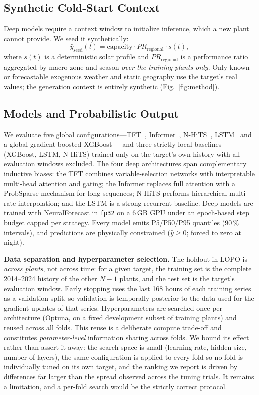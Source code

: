 \documentclass[conference]{IEEEtran}
\begin{document}
\subsection{Synthetic Cold-Start Context}
Deep models require a context window to initialize inference, which a new plant cannot
provide. We seed it synthetically:
\begin{equation}
\hat{y}_{\text{seed}}(t) = \mathrm{capacity}\cdot PR_{\text{regional}}\cdot s(t),
\end{equation}
where $s(t)$ is a deterministic solar profile and $PR_{\text{regional}}$ is a performance
ratio aggregated by macro-zone and season \emph{over the training plants only}. Only known or
forecastable exogenous weather and static geography use the target's real values; the
generation context is entirely synthetic (Fig.~\ref{fig:method}).

\subsection{Models and Probabilistic Output}
We evaluate five global configurations---TFT~\cite{Lim2021}, Informer~\cite{Zhou2021},
N-HiTS~\cite{Challu2023}, LSTM~\cite{Hochreiter1997} and a global gradient-boosted
XGBoost~\cite{Chen2016}---and three strictly local baselines (XGBoost, LSTM, N-HiTS) trained
only on the target's own history with all evaluation windows excluded. The four deep
architectures span complementary inductive biases: the TFT combines variable-selection
networks with interpretable multi-head attention and gating; the Informer replaces full
attention with a ProbSparse mechanism for long sequences; N-HiTS performs hierarchical
multi-rate interpolation; and the LSTM is a strong recurrent baseline. Deep models are
trained with NeuralForecast in \texttt{fp32} on a 6\,GB GPU under an epoch-based step budget
capped per strategy. Every model emits P5/P50/P95 quantiles (90\,\% intervals), and
predictions are physically constrained ($\hat{y}\!\geq\!0$; forced to zero at night).

\textbf{Data separation and hyperparameter selection.} The holdout in LOPO is \emph{across
plants}, not across time: for a given target, the training set is the complete 2014--2024
history of the other $N{-}1$ plants, and the test set is the target's evaluation window.
Early stopping uses the last 168 hours of each training series as a validation split, so
validation is temporally posterior to the data used for the gradient updates of that series.
Hyperparameters are searched once per architecture (Optuna, on a fixed development subset of
training plants) and reused across all folds. This reuse is a deliberate compute trade-off
and constitutes \emph{parameter-level} information sharing across folds. We bound its effect
rather than assert it away: the search space is small (learning rate, hidden size, number of
layers), the same configuration is applied to every fold so no fold is individually tuned on
its own target, and the ranking we report is driven by differences far larger than the spread
observed across the tuning trials. It remains a limitation, and a per-fold search would be
the strictly correct protocol.
\end{document}
